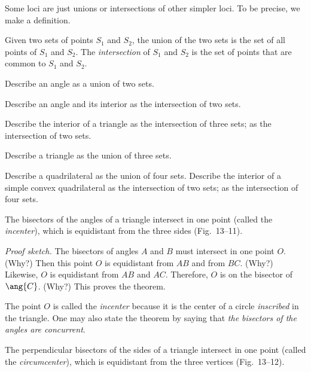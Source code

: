 \documentclass[11pt]{book}
\theoremstyle{bkplain}
\theoremstyle{XIplainnote}
\theoremstyle{bkplain}
\theoremstyle{bkplain}
\begin{document}
Some loci are just unions or intersections of other simpler loci. To be precise,
we make a definition.

\begin{definition}
Given two sets of points $S_1$ and $S_2$, the union of the two sets is the set of
all points of $S_1$ and $S_2$. The \emph{intersection} of $S_1$ and $S_2$ is the
set of points that are common to $S_1$ and $S_2$.
\end{definition}


\begin{exercisecols}
\begin{exlist}
\item Describe an angle as a union of two sets.
\item Describe an angle and its interior as the intersection of two sets.
\item Describe the interior of a triangle as the intersection of three sets; as
      the intersection of two sets.
\item Describe a triangle as the union of three sets.
\item Describe a quadrilateral as the union of four sets. Describe the interior
      of a simple convex quadrilateral as the intersection of two sets; as the
      intersection of four sets.
\end{exlist}
\end{exercisecols}

\begin{theorem}
The bisectors of the angles of a triangle intersect in one point (called the
\emph{incenter}), which is equidistant from the three sides (Fig.~13--11).
\end{theorem}

\FIGXIIIELEVEN

\noindent\emph{Proof sketch.} The bisectors of angles $A$ and $B$ must intersect
in one point $O$. (Why?) Then this point $O$ is equidistant from $AB$ and from
$BC$. (Why?) Likewise, $O$ is equidistant from $AB$ and $AC$. Therefore, $O$ is
on the bisector of $\ang{C}$. (Why?) This proves the theorem.

The point $O$ is called the \emph{incenter} because it is the center of a circle
\emph{inscribed} in the triangle. One may also state the theorem by saying that
\emph{the bisectors of the angles are concurrent}.

\FIGXIIITWELVE

\begin{theorem}
The perpendicular bisectors of the sides of a triangle intersect in one point
(called the \emph{circumcenter}), which is equidistant from the three vertices
(Fig.~13--12).
\end{theorem}
\end{document}
